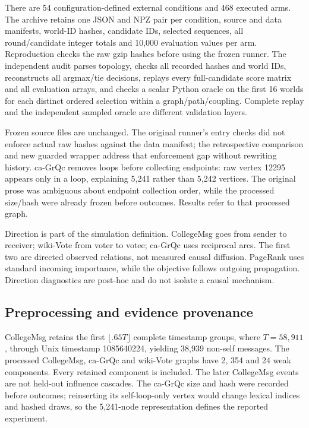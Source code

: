 \documentclass[smallextended]{svjour3}
\begin{document}
There are 54 configuration-defined external conditions and 468 executed arms.
The archive retains one JSON and NPZ pair per condition, source and data manifests,
world-ID hashes, candidate IDs, selected sequences, all round/candidate integer
totals and 10,000 evaluation values per arm. Reproduction checks the raw gzip
hashes before using the frozen runner. The independent audit
parses topology, checks all recorded hashes and world IDs, reconstructs all
argmax/tie decisions, replays every full-candidate score matrix and all evaluation
arrays, and checks a scalar Python oracle on the first 16 worlds for each
distinct ordered selection within a graph/path/coupling. Complete replay and the
independent sampled oracle are different validation layers.

Frozen source files are unchanged. The original runner's entry checks did not
enforce actual raw hashes against the data manifest; the retrospective comparison
and new guarded wrapper address that enforcement gap without rewriting history.
ca-GrQc removes loops before collecting endpoints: raw vertex 12295 appears only
in a loop, explaining 5,241 rather than 5,242 vertices. The original prose was
ambiguous about endpoint collection order, while the processed size/hash were
already frozen before outcomes. Results refer to that processed graph.

Direction is part of the simulation definition. CollegeMsg goes from sender to
receiver; wiki-Vote from voter to votee; ca-GrQc uses reciprocal arcs. The first
two are directed observed relations, not measured causal diffusion. PageRank uses
standard incoming importance, while the objective follows outgoing propagation.
Direction diagnostics are post-hoc and do not isolate a causal mechanism.

\subsection{Preprocessing and evidence provenance}
CollegeMsg retains the first $\lfloor .65T\rfloor$ complete timestamp groups,
where $T=58,911$, through Unix timestamp 1085640224, yielding 38,939 non-self
messages. The processed CollegeMsg, ca-GrQc and wiki-Vote graphs have 2, 354 and
24 weak components. Every retained component is included. The later CollegeMsg
events are not held-out influence cascades. The ca-GrQc size and hash were
recorded before outcomes; reinserting its self-loop-only vertex would change
lexical indices and hashed draws, so the 5,241-node representation defines the
reported experiment.
\end{document}
